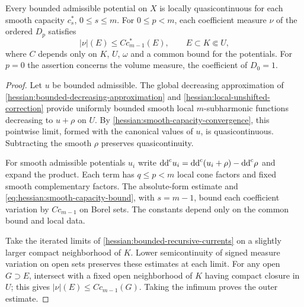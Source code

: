 \begin{lemma}\label{hessian:rough-coefficient-capacity}
Every bounded admissible potential on $X$ is locally quasicontinuous
for each smooth capacity $c_s^*$, $0\leq s\leq m$. For $0\leq p<m$,
each coefficient measure $\nu$ of the ordered $D_p$ satisfies
\[
 |\nu|(E)\leq C c_{m-1}^*(E),\qquad E\subset K\Subset U,
\]
where $C$ depends only on $K$, $U$, $\omega$ and a common bound for
the potentials. For $p=0$ the assertion concerns the volume measure,
the coefficient of $D_0=1$.
\end{lemma}
\begin{proof}
Let $u$ be bounded admissible. The global decreasing approximation
of \cref{hessian:bounded-decreasing-approximation} and
\cref{hessian:local-unshifted-correction} provide uniformly bounded
smooth local $m$-subharmonic functions decreasing to $u+\rho$ on $U$.
By \cref{hessian:smooth-capacity-convergence}, this pointwise limit,
formed with the canonical values of $u$, is quasicontinuous.
Subtracting the smooth $\rho$ preserves quasicontinuity.

For smooth admissible potentials $u_i$ write
$\mathrm{dd}^{\mathrm{c}} u_i=\mathrm{dd}^{\mathrm{c}}(u_i+\rho)-\mathrm{dd}^{\mathrm{c}}\rho$ and expand the product.
Each term has $q\leq p<m$ local cone factors and fixed smooth
complementary factors. The absolute-form estimate and
\eqref{eq:hessian:smooth-capacity-bound}, with $s=m-1$, bound
each coefficient variation by $C c_{m-1}$ on Borel sets.
The constants depend only on the common bound and local data.

Take the iterated limits of
\cref{hessian:bounded-recursive-currents} on a slightly larger
compact neighborhood of $K$. Lower semicontinuity of signed
measure variation on open sets preserves these estimates at each
limit. For any open $G\supset E$, intersect with a fixed open
neighborhood of $K$ having compact closure in $U$; this gives
$|\nu|(E)\leq Cc_{m-1}(G)$. Taking the infimum proves the outer
estimate.
\end{proof}

